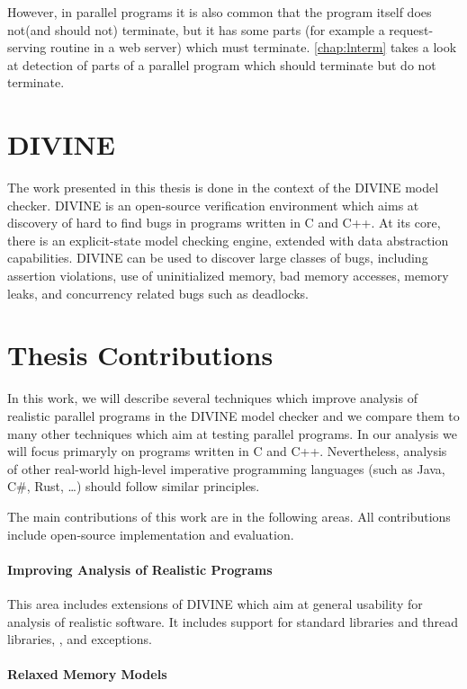 However, in parallel programs it is also common that the program itself does
not(and should not) terminate, but it has some parts (for example a
request-serving routine in a web server) which must terminate.
\autoref{chap:lnterm} takes a look at detection of parts of a parallel program which should terminate but do not terminate.

\section{DIVINE}

The work presented in this thesis is done in the context of the DIVINE model checker.
DIVINE is an open-source verification environment which aims at discovery of hard to find bugs in programs written in C and C++.
At its core, there is an explicit-state model checking engine, extended with data abstraction capabilities.
DIVINE can be used to discover large classes of bugs, including assertion violations, use of uninitialized memory, bad memory accesses, memory leaks, and concurrency related bugs such as deadlocks.


\section{Thesis Contributions}

In this work, we will describe several techniques which improve analysis of realistic parallel programs in the DIVINE model checker and we compare them to many other techniques which aim at testing parallel programs.
In our analysis we will focus primaryly on programs written in C and C++.
Nevertheless, analysis of other real-world high-level imperative programming languages (such as Java, C\#, Rust, …) should follow similar principles.

The main contributions of this work are in the following areas.
All contributions include open-source implementation and evaluation.

\paragraph{Improving Analysis of Realistic Programs}

This area includes extensions of DIVINE which aim at general usability for analysis of realistic software.
It includes support for standard libraries and thread libraries, , and exceptions.

\paragraph{Relaxed Memory Models}

